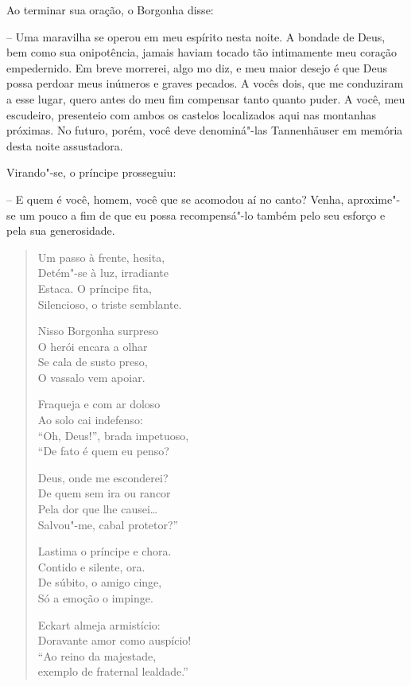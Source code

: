 Ao terminar sua oração, o Borgonha disse:

-- Uma maravilha se operou em meu espírito nesta noite. A bondade de
Deus, bem como sua onipotência, jamais haviam tocado tão intimamente
meu coração empedernido. Em breve morrerei, algo mo diz, e meu maior
desejo é que Deus possa perdoar meus inúmeros e graves pecados. A vocês
dois, que me conduziram a esse lugar, quero antes do meu fim compensar
tanto quanto puder. A você, meu escudeiro, presenteio com ambos os
castelos localizados aqui nas montanhas próximas. No futuro, porém,
você deve denominá"-las Tannenhäuser em memória desta noite assustadora.

Virando"-se, o príncipe prosseguiu:

-- E quem é você, homem, você que se acomodou aí no canto? Venha,
aproxime"-se um pouco a fim de que eu possa recompensá"-lo também pelo
seu esforço e pela sua generosidade.

\begin{verse}
Um passo à frente, hesita,\\
Detém"-se à luz, irradiante\\
Estaca. O príncipe fita,\\
Silencioso, o triste semblante.

Nisso Borgonha surpreso\\
O herói encara a olhar\\
Se cala de susto preso,\\
O vassalo vem apoiar.

Fraqueja e com ar doloso\\
Ao solo cai indefenso:\\
``Oh, Deus!'', brada impetuoso,\\
``De fato é quem eu penso?

Deus, onde me esconderei?\\
De quem sem ira ou rancor\\
Pela dor que lhe causei\ldots{} \\
Salvou"-me, cabal protetor?''

Lastima o príncipe e chora.\\
Contido e silente, ora.\\
De súbito, o amigo cinge,\\
Só a emoção o impinge.

Eckart almeja armistício:\\
Doravante amor como auspício!\\
``Ao reino da majestade,\\
exemplo de fraternal lealdade.''
\end{verse}

